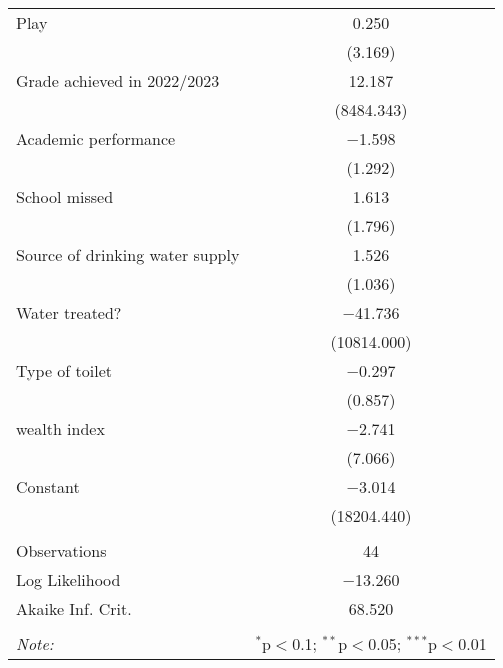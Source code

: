 \begin{table}[!htbp]
\begin{tabular}{@{\extracolsep{3pt}}lc}
  Play & 0.250 \\ 
  & (3.169) \\ 
  Grade achieved in 2022/2023 & 12.187 \\ 
  & (8484.343) \\ 
  Academic performance & $-$1.598 \\ 
  & (1.292) \\ 
  School missed & 1.613 \\ 
  & (1.796) \\ 
  Source of drinking water supply & 1.526 \\ 
  & (1.036) \\ 
  Water treated? & $-$41.736 \\ 
  & (10814.000) \\ 
  Type of toilet & $-$0.297 \\ 
  & (0.857) \\ 
  wealth index & $-$2.741 \\ 
  & (7.066) \\ 
  Constant & $-$3.014 \\ 
  & (18204.440) \\ 
 \hline \\[-1.8ex] 
Observations & 44 \\ 
Log Likelihood & $-$13.260 \\ 
Akaike Inf. Crit. & 68.520 \\ 
\hline 
\hline \\[-1.8ex] 
\textit{Note:}  & \multicolumn{1}{r}{$^{*}$p$<$0.1; $^{**}$p$<$0.05; $^{***}$p$<$0.01} \\ 
\end{tabular} 
\end{table} 

